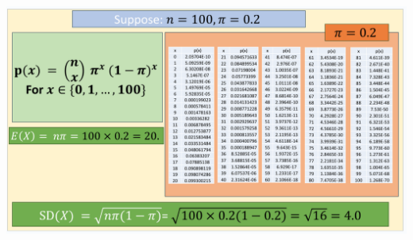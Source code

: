 \documentclass[compress]{beamer}
\begin{document}
\begin{frame}
\vspace{-.11in}

\\
\vspace{2.8in}
\end{frame}




\begin{frame}
\vspace{-.1in}
\begin{center}
\includegraphics[scale=.45]{figs/BinomialExpectedValue.png}
\end{center}
\vspace{1in}
\end{frame}
\end{document}
